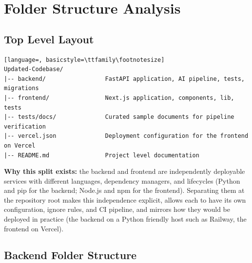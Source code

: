\documentclass[11pt,a4paper]{report}
\begin{document}
\chapter{Folder Structure Analysis}

\section{Top Level Layout}

\begin{lstlisting}[language=, basicstyle=\ttfamily\footnotesize]
Updated-Codebase/
|-- backend/                 FastAPI application, AI pipeline, tests, migrations
|-- frontend/                Next.js application, components, lib, tests
|-- tests/docs/              Curated sample documents for pipeline verification
|-- vercel.json              Deployment configuration for the frontend on Vercel
|-- README.md                Project level documentation
\end{lstlisting}

\textbf{Why this split exists:} the backend and frontend are independently deployable services with different languages, dependency managers, and lifecycles (Python and pip for the backend; Node.js and npm for the frontend). Separating them at the repository root makes this independence explicit, allows each to have its own configuration, ignore rules, and CI pipeline, and mirrors how they would be deployed in practice (the backend on a Python friendly host such as Railway, the frontend on Vercel).

\section{Backend Folder Structure}
\end{document}
